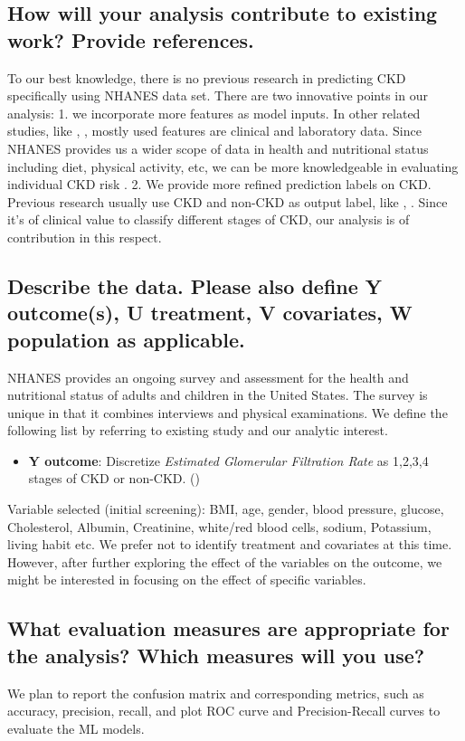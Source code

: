 \documentclass[twoside,11pt]{article}
\begin{document}
\subsection{How will your analysis contribute to existing work? Provide references.}
To our best knowledge, there is no previous research in predicting CKD specifically using NHANES data set. There are two innovative points in our analysis: 1. we incorporate more features as model inputs. In other related studies, like \cite{Vijayarani}, \cite{Charleonnan}, mostly used features are clinical and laboratory data. Since NHANES provides us a wider scope of data in health and nutritional status including diet, physical activity, etc, we can be more knowledgeable in evaluating individual CKD risk . 2. We provide more refined prediction labels on CKD. Previous research usually use CKD and non-CKD as output label, like \cite{Vijayarani}, \cite{Charleonnan}. Since it's of clinical value to classify different stages of CKD, our analysis is of contribution in this respect. 

 

\subsection{Describe the data. Please also define Y outcome(s), U treatment, V covariates, W population as applicable.}
NHANES provides an ongoing survey and assessment for the health and nutritional status of adults and children in the United States. The survey is unique in that it combines interviews and physical examinations. We define the following list by referring to existing study and our analytic interest. 
\begin{itemize}
\item \textbf{Y outcome}: Discretize \textit{Estimated Glomerular Filtration Rate} as 1,2,3,4 stages of CKD or non-CKD. (\cite{Levey})
\end{itemize}
Variable selected (initial screening):
BMI, age, gender, blood pressure, glucose, Cholesterol, Albumin, Creatinine, white/red blood cells, sodium, Potassium, living habit etc.
We prefer not to identify treatment and covariates at this time. However, after further exploring the effect of the variables on the outcome, we might be interested in focusing on the effect of specific variables.



\subsection{What evaluation measures are appropriate for the analysis? Which measures will you use?}
We plan to report the confusion matrix and corresponding metrics, such as accuracy, precision, recall, and plot ROC curve and Precision-Recall curves to evaluate the ML models. 
\end{document}
